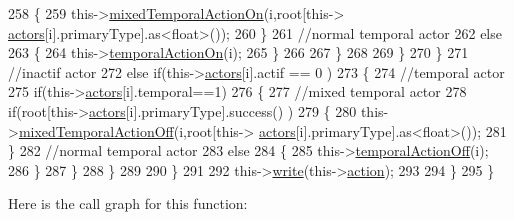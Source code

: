 \begin{DoxyCode}
258                         \{
259                             this->\hyperlink{class_jetpack_af44bc8a08818e4433dfb1c7104601f12}{mixedTemporalActionOn}(i,root[this->
      \hyperlink{class_jetpack_a7e16d2f97837f9712a2e6de1c50d99db}{actors}[i].primaryType].as<float>());
260                         \}
261                         \textcolor{comment}{//normal temporal actor}
262                         \textcolor{keywordflow}{else}
263                         \{
264                             this->\hyperlink{class_jetpack_ad011d904f639accb5f94ef806846ef59}{temporalActionOn}(i);
265                         \}
266                                             
267                     \}
268 
269                 \}
270             \}
271             \textcolor{comment}{//inactif actor}
272             \textcolor{keywordflow}{else} \textcolor{keywordflow}{if}(this->\hyperlink{class_jetpack_a7e16d2f97837f9712a2e6de1c50d99db}{actors}[i].actif == 0 )
273             \{
274                 \textcolor{comment}{//temporal actor}
275                 \textcolor{keywordflow}{if}(this->\hyperlink{class_jetpack_a7e16d2f97837f9712a2e6de1c50d99db}{actors}[i].temporal==1)
276                 \{
277                     \textcolor{comment}{//mixed temporal actor}
278                     \textcolor{keywordflow}{if}(root[this->\hyperlink{class_jetpack_a7e16d2f97837f9712a2e6de1c50d99db}{actors}[i].primaryType].success() )
279                     \{
280                         this->\hyperlink{class_jetpack_af2f567ef6311a8fc2f7bb948837667b7}{mixedTemporalActionOff}(i,root[this->
      \hyperlink{class_jetpack_a7e16d2f97837f9712a2e6de1c50d99db}{actors}[i].primaryType].as<float>());
281                     \}
282                     \textcolor{comment}{//normal temporal actor}
283                     \textcolor{keywordflow}{else}
284                     \{
285                         this->\hyperlink{class_jetpack_a2991b302cd99bf89325f9b66b104d575}{temporalActionOff}(i);
286                     \}
287                 \}           
288             \}
289 
290         \}
291 
292         this->\hyperlink{class_jetpack_a338f1af8cbc6504ac69b47c7328569b5}{write}(this->\hyperlink{class_jetpack_aca3142925a7b0834b34ae91d26af7765}{action});
293 
294     \} 
295 \}
\end{DoxyCode}
Here is the call graph for this function\+:
\nopagebreak
